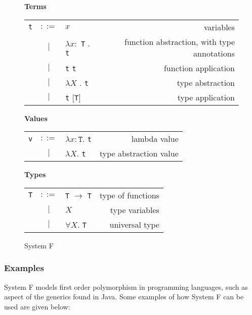 \begin{figure}[H]\label{fig:systemF}
    \vspace{1cm}
    \textbf{Terms} \\
    \begin{tabular}{l c p{3cm} r}
        \texttt{t} & $ ::= $ & $ x $ &                   variables \\
      & $ | $ & $ \lambda x : $ \texttt{T} . \texttt{t} &          function abstraction, with type annotations \\
      & $ | $ & \texttt{t} \texttt{t} &          function application \\
      & $ | $ & $ \lambda X $ . \texttt{t} &          type abstraction \\
      & $ | $ & \texttt{t} [\texttt{T}] &          type application \\
    \end{tabular}

    \vspace{1cm}
    \textbf{Values} \\
    \begin{tabular}{l c p{3cm} r}
        \texttt{v} & $ ::= $ & $ \lambda x : \texttt{T} . $ \texttt{t} &                   lambda value \\
      & $ | $ & $ \lambda X . $ \texttt{t} &   type abstraction value \\
    \end{tabular}

    \vspace{1cm}
    \textbf{Types} \\
    \begin{tabular}{l c p{3cm} r}
        \texttt{T} & $ ::= $ & \texttt{T} $ \rightarrow $ \texttt{T} &      type of functions \\
        & $ | $ & $ X $ &       type variables \\
        & $ | $ & $ \forall X . $ \texttt{T} &       universal type \\
    \end{tabular}

    \caption{System F}
\end{figure}

\subsubsection{Examples}
System F models first order polymorphism in programming languages, such as aspect of
the generics found in Java. Some examples of how System F can be used are given
below:

